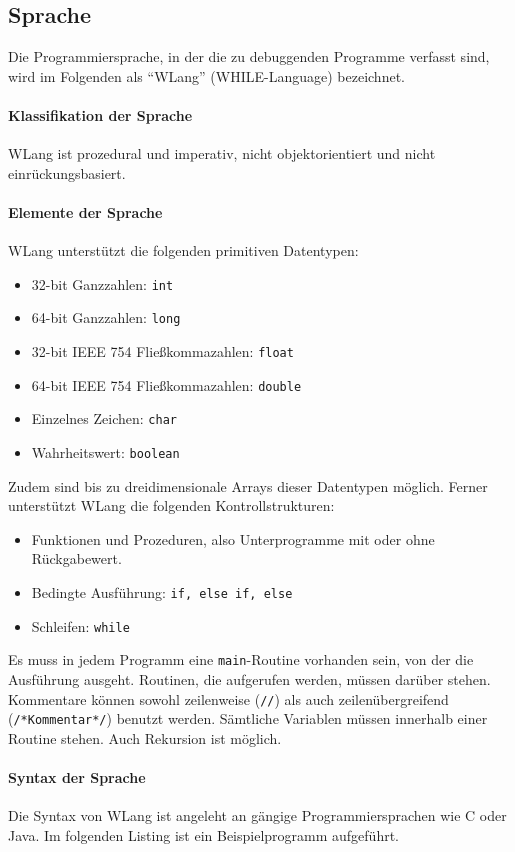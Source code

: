 \documentclass[parskip=full]{scrartcl}
\begin{document}
\subsection{Sprache}
Die Programmiersprache, in der die zu debuggenden Programme verfasst sind, wird im Folgenden als \enquote{WLang} (WHILE-Language) bezeichnet. 
\paragraph{Klassifikation der Sprache} WLang ist prozedural und imperativ, nicht objektorientiert und nicht einrückungsbasiert.
\paragraph{Elemente der Sprache}
WLang unterstützt die folgenden primitiven Datentypen:
\begin{itemize}
\item  32-bit Ganzzahlen: \texttt{int}
  \item  64-bit Ganzzahlen: \texttt{long}
 \item  32-bit IEEE 754 Fließkommazahlen: \texttt{float}
 \item   64-bit IEEE 754 Fließkommazahlen: \texttt{double}
  \item  Einzelnes Zeichen: \texttt{char}
  \item  Wahrheitswert: \texttt{boolean}
\end{itemize}
Zudem sind bis zu dreidimensionale Arrays dieser Datentypen möglich.
Ferner unterstützt WLang die folgenden Kontrollstrukturen:
\begin{itemize}
\item Funktionen und Prozeduren, also Unterprogramme mit oder ohne Rückgabewert.
\item Bedingte Ausführung: \texttt{if, else if, else}
\item Schleifen: \texttt{while}
\end{itemize}
Es muss in jedem Programm eine \texttt{main}-Routine vorhanden sein, von der die Ausführung ausgeht. Routinen, die aufgerufen werden, müssen darüber stehen. Kommentare können sowohl zeilenweise (\texttt{//}) als auch zeilenübergreifend (\texttt{/*Kommentar*/}) benutzt werden. Sämtliche Variablen müssen innerhalb einer Routine stehen. Auch Rekursion ist möglich.
\newpage

\paragraph{Syntax der Sprache}
Die Syntax von WLang ist angeleht an gängige Programmiersprachen wie C oder Java. Im folgenden Listing ist ein Beispielprogramm aufgeführt. 
\end{document}
